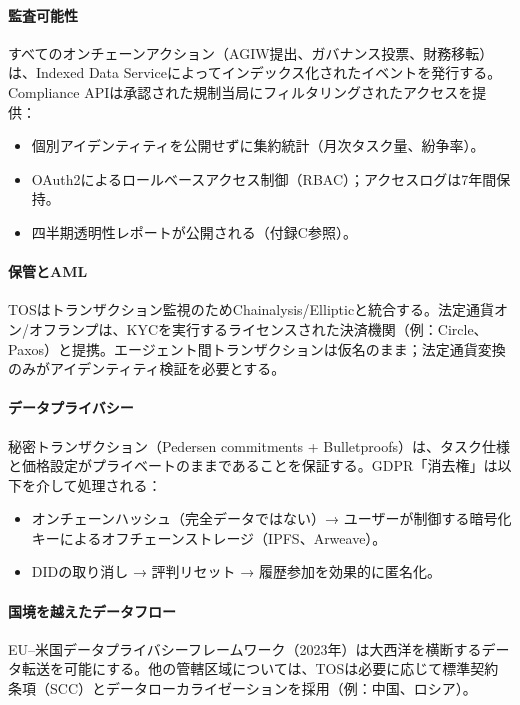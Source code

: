 \documentclass[11pt]{article}
\begin{document}
\paragraph{監査可能性}
すべてのオンチェーンアクション（AGIW提出、ガバナンス投票、財務移転）は、Indexed Data Serviceによってインデックス化されたイベントを発行する。Compliance APIは承認された規制当局にフィルタリングされたアクセスを提供：
\begin{itemize}[noitemsep]
  \item 個別アイデンティティを公開せずに集約統計（月次タスク量、紛争率）。
  \item OAuth2によるロールベースアクセス制御（RBAC）；アクセスログは7年間保持。
  \item 四半期透明性レポートが公開される（付録C参照）。
\end{itemize}

\paragraph{保管とAML}
TOSはトランザクション監視のためChainalysis/Ellipticと統合する。法定通貨オン/オフランプは、KYCを実行するライセンスされた決済機関（例：Circle、Paxos）と提携。エージェント間トランザクションは仮名のまま；法定通貨変換のみがアイデンティティ検証を必要とする。

\paragraph{データプライバシー}
秘密トランザクション（Pedersen commitments + Bulletproofs）は、タスク仕様と価格設定がプライベートのままであることを保証する。GDPR「消去権」は以下を介して処理される：
\begin{itemize}[noitemsep]
  \item オンチェーンハッシュ（完全データではない）→ ユーザーが制御する暗号化キーによるオフチェーンストレージ（IPFS、Arweave）。
  \item DIDの取り消し → 評判リセット → 履歴参加を効果的に匿名化。
\end{itemize}

\paragraph{国境を越えたデータフロー}
EU--米国データプライバシーフレームワーク（2023年）は大西洋を横断するデータ転送を可能にする。他の管轄区域については、TOSは必要に応じて標準契約条項（SCC）とデータローカライゼーションを採用（例：中国、ロシア）。
\end{document}
